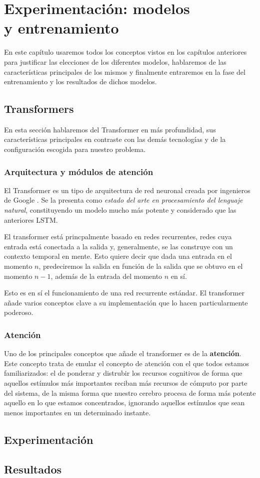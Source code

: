 \chapter{Experimentación: modelos \\ y entrenamiento}

En este capítulo usaremos todos los conceptos vistos en los capítulos anteriores para justificar las elecciones de los diferentes modelos, hablaremos de las características principales de los mismos y finalmente entraremos en la fase del entrenamiento y los resultados de dichos modelos.



\section{Transformers}
En esta sección hablaremos del Transformer en más profundidad, sus características principales en contraste con las demás tecnologías y de la configuración escogida para nuestro problema.

\subsection{Arquitectura y módulos de atención}
El Transformer es un tipo de arquitectura de red neuronal creada por ingenieros de Google \cite{WolfEtal2020Transformers}. Se la presenta como \textit{estado del arte en procesamiento del lenguaje natural}, constituyendo un modelo mucho más potente y considerado que las anteriores LSTM.

El transformer está princpalmente basado en redes recurrentes, redes cuya entrada está conectada a la salida y, generalmente, se las construye con un contexto temporal en mente. Esto quiere decir que dada una entrada en el momento $n$, predeciremos la salida en función de la salida que se obtuvo en el momento $n - 1$, además de la entrada del momento $n$ en sí.

Esto es en sí el funcionamiento de una red recurrente estándar. El transformer añade varios conceptos clave a su implementación que lo hacen particularmente poderoso.

\subsection{Atención}
Uno de los principales conceptos que añade el transformer es de la \textbf{atención}. Este concepto trata de emular el concepto de atención con el que todos estamos familiarizados: el de ponderar y distrubir los recursos cognitivos de forma que aquellos estímulos más importantes reciban más recursos de cómputo por parte del sistema, de la misma forma que nuestro cerebro procesa de forma más potente aquello en lo que estamos concentrados, ignorando aquellos estímulos que sean menos importantes en un determinado instante.





\section{Experimentación}


\section{Resultados}
